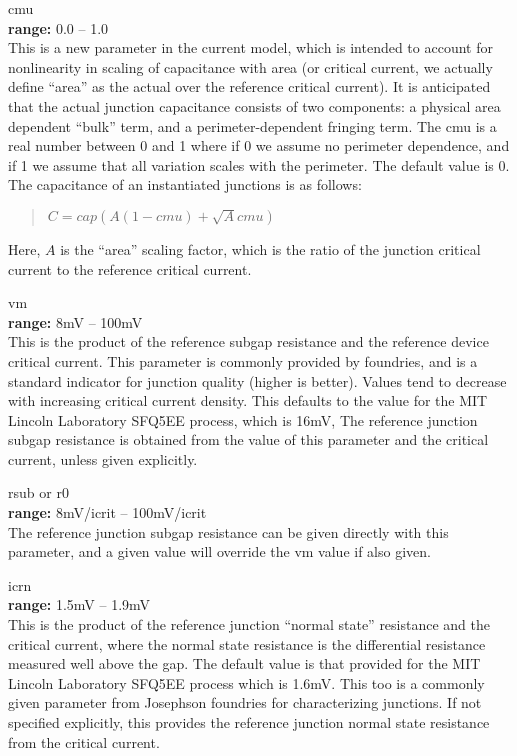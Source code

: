 \begin{description}
\item{\vt cmu}\\
{\bf range:} 0.0 -- 1.0\\
This is a new parameter in the current model, which is intended to
account for nonlinearity in scaling of capacitance with area (or
critical current, we actually define ``area'' as the actual over the
reference critical current).  It is anticipated that the actual
junction capacitance consists of two components:  a physical area
dependent ``bulk'' term, and a perimeter-dependent fringing term.  The
{\vt cmu} is a real number between 0 and 1 where if 0 we assume no
perimeter dependence, and if 1 we assume that all variation scales
with the perimeter.  The default value is 0.  The capacitance of an
instantiated junctions is as follows:
\begin{quote}
$C = cap (A(1-cmu) + \sqrt{A} cmu)$
\end{quote}
Here, $A$ is the ``area'' scaling factor, which is the ratio of the
junction critical current to the reference critical current.

\item{\vt vm}\\
{\bf range:} 8mV -- 100mV\\
This is the product of the reference subgap resistance and the
reference device critical current.  This parameter is commonly
provided by foundries, and is a standard indicator for junction
quality (higher is better).  Values tend to decrease with increasing
critical current density.  This defaults to the value for the MIT
Lincoln Laboratory SFQ5EE process, which is 16mV, The reference
junction subgap resistance is obtained from the value of this
parameter and the critical current, unless given explicitly.

\item{{\vt rsub} or {\vt r0}}\\
{\bf range:} 8mV/{\vt icrit} -- 100mV/{\vt icrit}\\
The reference junction subgap resistance can be given directly
with this parameter, and a given value will override the
{\vt vm} value if also given.

\item{\vt icrn}\\
{\bf range:} 1.5mV -- 1.9mV\\
This is the product of the reference junction ``normal state''
resistance and the critical current, where the normal state resistance
is the differential resistance measured well above the gap.  The
default value is that provided for the MIT Lincoln Laboratory SFQ5EE
process which is 1.6mV.  This too is a commonly given parameter from
Josephson foundries for characterizing junctions.  If not specified
explicitly, this provides the reference junction normal state
resistance from the critical current.


\end{description}
